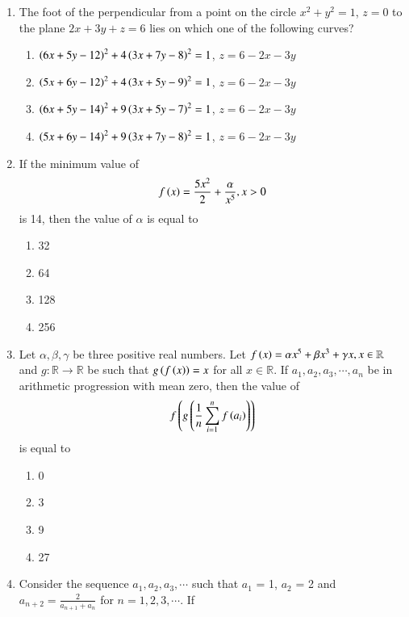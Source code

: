 \documentclass[journal]{IEEEtran}
\begin{document}
\begin{enumerate}
\item The foot of the perpendicular from a point on the circle $x^2 + y^2 = 1$, $z = 0$ to the plane $2x + 3y + z = 6$ lies on which one of the following curves?
\begin{enumerate}
    \item $\left(6x + 5y - 12\right)^2 + 4\left(3x + 7y - 8\right)^2 = 1$, $z = 6 - 2x - 3y$
    \item $\left(5x + 6y - 12\right)^2 + 4\left(3x + 5y - 9\right)^2 = 1$, $z = 6 - 2x - 3y$
    \item $\left(6x + 5y - 14\right)^2 + 9\left(3x + 5y - 7\right)^2 = 1$, $z = 6 - 2x - 3y$
    \item $\left(5x + 6y - 14\right)^2 + 9\left(3x + 7y - 8\right)^2 = 1$, $z = 6 - 2x - 3y$\\
\end{enumerate}
\item If the minimum value of 
\begin{align*}
    f\left(x\right) = \frac{5x^2}{2} + \frac{\alpha}{x^5}, x>0
\end{align*}
is 14, then the value of $\alpha$ is equal to
  \begin{enumerate}
      \item 32
      \item 64
      \item 128
      \item 256\\
  \end{enumerate}
\item Let $\alpha, \beta, \gamma$ be three positive real numbers. Let $f\left(x\right) = \alpha x^5 + \beta x^3 + \gamma x, x \in \mathbb{R}$ and $g:\mathbb{R}\rightarrow\mathbb{R}$ be such that $g\left(f\left(x\right)\right) = x$ for all $x\in\mathbb{R}$. If $a_1, a_2, a_3, \cdots, a_n$ be in arithmetic progression with mean zero, then the value of 
\begin{align*}
    f\left(g\left(\frac{1}{n}\sum_{i=1}^{n}f\left(a_i\right)\right)\right)
\end{align*}
is equal to
     \begin{enumerate}
         \item 0
         \item 3
         \item 9
         \item 27\\
     \end{enumerate}
\item Consider the sequence $a_1, a_2, a_3, \cdots$ such that $a_1$ = 1, $a_2$ = 2 and $a_{n+2} = \frac{2}{a_{n+1} + a_n}$ for $n = 1, 2, 3, \cdots$. If 

\end{enumerate}
\end{document}
